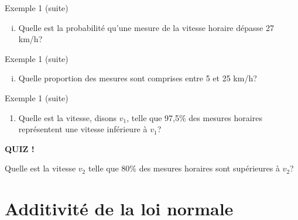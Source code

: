 \documentclass{BeamerTemplate}
\begin{document}
\begin{frame}[t]{Exemple 1 (suite)}

{\small
\begin{enumerate}[(i)]
\item Quelle est la probabilité qu'une mesure de la vitesse horaire dépasse  27 km/h?

\end{enumerate}}

\end{frame}

\begin{frame}[t]{Exemple 1 (suite)}

{\small
\begin{enumerate}[(ii)]
\item Quelle proportion des mesures sont comprises entre 5 et 25 km/h?

\end{enumerate}}

\end{frame}

\begin{frame}[t]{Exemple 1 (suite)}

{\small
\begin{enumerate}
\item[(iii)] Quelle est la vitesse, disons $v_1$, telle que 97,5\% des mesures horaires représentent une vitesse inférieure à $v_1$? %
\end{enumerate}}

\end{frame}



\begin{frame}[plain, t]%


\centerline{\LARGE\bf \alert{QUIZ !}}
\bigskip

\small
Quelle est la vitesse $v_2$ telle que 80\% des mesures horaires sont supérieures à $v_2$? %
\vspace{5.5cm}

\end{frame}

\section{Additivité de la loi normale}
\end{document}

